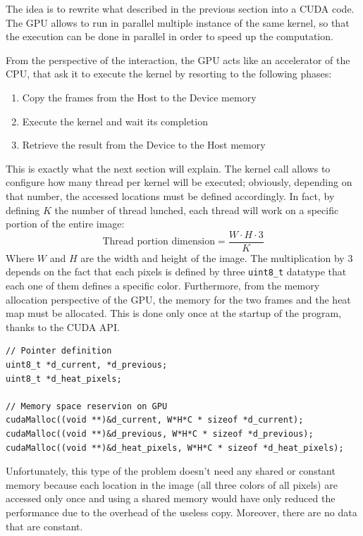 \documentclass[paper=a4, fontsize=10pt]{scrartcl}	%
\begin{document}
	The idea is to rewrite what described in the previous section into a CUDA code. The GPU allows to run in parallel multiple instance of the same kernel, so that the execution can be done in parallel in order to speed up the computation.
	
	From the perspective of the interaction, the GPU acts like an accelerator of the CPU, that ask it to execute the kernel by resorting to the following phases:
	\begin{enumerate}
		\itemsep0sp
		\item Copy the frames from the Host to the Device memory
		\item Execute the kernel and wait its completion
		\item Retrieve the result from the Device to the Host memory
	\end{enumerate}
	
	This is exactly what the next section will explain. The kernel call allows to configure how many thread per kernel will be executed; obviously, depending on that number, the accessed locations must be defined accordingly. In fact, by defining $K$ the number of thread lunched, each thread will work on a specific portion of the entire image:
	\[
		\text{Thread portion dimension} = \frac{W \cdot H \cdot 3}{K}
	\]
	Where $W$ and $H$ are the width and height of the image. The multiplication by 3 depends on the fact that each pixels is defined by three \texttt{uint8\_t} datatype that each one of them defines a specific color. \newline\newline
	Furthermore, from the memory allocation perspective of the GPU, the memory for the two frames and the heat map must be allocated. This is done only once at the startup of the program, thanks to the CUDA API.	

\begin{lstlisting}[style=CStyle]
// Pointer definition
uint8_t *d_current, *d_previous;
uint8_t *d_heat_pixels;	

// Memory space reservion on GPU	
cudaMalloc((void **)&d_current, W*H*C * sizeof *d_current);
cudaMalloc((void **)&d_previous, W*H*C * sizeof *d_previous);
cudaMalloc((void **)&d_heat_pixels, W*H*C * sizeof *d_heat_pixels);\end{lstlisting}

	Unfortunately, this type of the problem doesn't need any shared or constant memory because each location in the image (all three colors of all pixels) are accessed only once and using a shared memory would have only reduced the performance due to the overhead of the useless copy. Moreover, there are no data that are constant.
	
\end{document}
